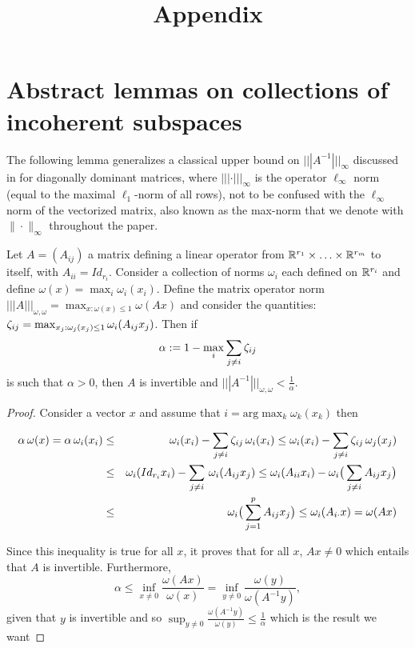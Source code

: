 \documentclass{article}
\title{Appendix}
\date{}
\begin{document}
\maketitle
\appendix


\section{Abstract lemmas on collections of incoherent subspaces}
The following lemma generalizes a classical upper bound on $|||A^{-1}|||_{\infty}$ discussed in \citet{varga1976diagonal} for diagonally dominant matrices, where $|||\cdot|||_{\infty}$ is the operator $\ell_\infty$ norm (equal to the maximal $\ell_1$-norm of all rows), not to be confused with the 
$\ell_\infty$ norm of the vectorized matrix, also known as the max-norm that we denote with $\|\cdot\|_{\infty}$ throughout the paper.

\begin{lemma}
\label{lem:gbdd}
Let $A=(A_{ij})$ a matrix defining a linear operator from $\mathbb{R}^{r_1} \times \ldots \times \mathbb{R}^{r_m}$ to itself, with $A_{ii}=Id_{r_i}$. Consider a collection of norms $\omega_i$ each defined on $\mathbb{R}^{r_i}$
and define $\omega(x)=\max_i \omega_i(x_i)$. Define the matrix operator norm $|||A|||_{\omega,\omega}=\max_{x:\omega(x)\leq 1} \omega(Ax)$ and consider the quantities:
$\zeta_{ij}=\max_{x_j:\omega_j(x_j) \leq 1} \omega_i(A_{ij}x_j)$.
Then if 
$$\alpha:=1-\max_{i} \sum_{j \neq i} \zeta_{ij}$$ is such that $\alpha >0$, then $A$ is invertible and $|||A^{-1}|||_{\omega,\omega}< \frac{1}{\alpha}$.
\end{lemma}
\begin{proof}
Consider a vector $x$ and assume that $i=\text{arg} \max_{k} \omega_k(x_k)$ then

\begin{eqnarray*}
\alpha \, \omega(x) =\alpha \, \omega_i(x_i) &\leq & \omega_i(x_i) -\sum_{j\neq i} \zeta_{ij}  \, \omega_i(x_i) \leq \omega_i(x_i) -\sum_{j\neq i} \zeta_{ij}  \, \omega_j(x_j)\\
&\leq& \omega_i(Id_{r_i} x_i) -\sum_{j\neq i} \, \omega_i(A_{ij} x_j)
\leq \omega_i(A_{ii} x_i) -\omega_i \big ( \sum_{j\neq i} A_{ij} x_j \big )\\
&\leq&\omega_i \big ( \sum_{j=1}^p A_{ij} x_j \big )
\leq\omega_i (A_{i\cdot}x)=\omega(A x)\\
\end{eqnarray*}

Since this inequality is true for all $x$, it proves that for all $x$, $Ax\neq0$ which entails that $A$ is invertible.
Furthermore,
$$\alpha\leq \inf_{x\neq 0} \frac{\omega(A x)}{\omega(x)}=\inf_{y\neq 0} \frac{\omega(y)}{\omega(A^{-1}y)},$$
given that $y$ is invertible and so $\sup_{y \neq 0}\frac{\omega(A^{-1}y)}{\omega(y)}\leq \frac{1}{\alpha}$ which is the result we want
\end{proof}
\end{document}
